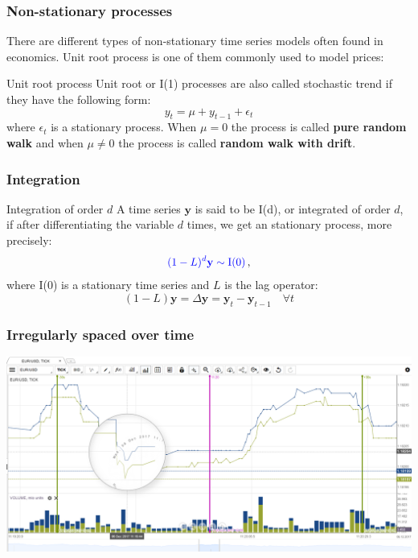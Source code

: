 \documentclass{beamer}
\begin{document}
\begin{frame}
\frametitle{Non-stationary processes}
There are different types of non-stationary time series models often found in economics. Unit root process is one of them commonly used to model prices:
\begin{block}{Unit root process}
{\color{red}Unit root or I(1)} processes are also called stochastic trend if they have the following form:
{\color{blue}
\[
y_t = \mu + y_{t-1} + \epsilon_t
\]}
\noindent where $\epsilon_t$ is a stationary process. When $\mu = 0 $ the process is called {\bf pure random walk} and when $\mu \neq 0$  the process is called {\bf random walk with drift}.
\end{block}
\end{frame}


\begin{frame}
\frametitle{Integration }
\begin{block}{Integration of order $d$}
A time series $\mathbf{y}$ is said to be I(d), or integrated of order $d$, if after
differentiating the variable $d$ times, we get an stationary process, more precisely:
\[
{\color{blue}
(1-L)^d \mathbf{y} \sim \text{I(0)}} \, ,
\]
\noindent where I(0) is a stationary time series and $L$ is the lag operator:
\[
(1-L)\mathbf{y} = \Delta \mathbf{y}=\mathbf{y}_t  -\mathbf{y}_{t-1} \quad \forall t
\]
\end{block}
\end{frame}

\begin{frame}
\frametitle{Irregularly spaced over time}
\centerline{
\includegraphics[width=\paperwidth,height=0.7\paperheight]{img/hft-ticks-zoom.png}
}
\end{frame}
\end{document}
